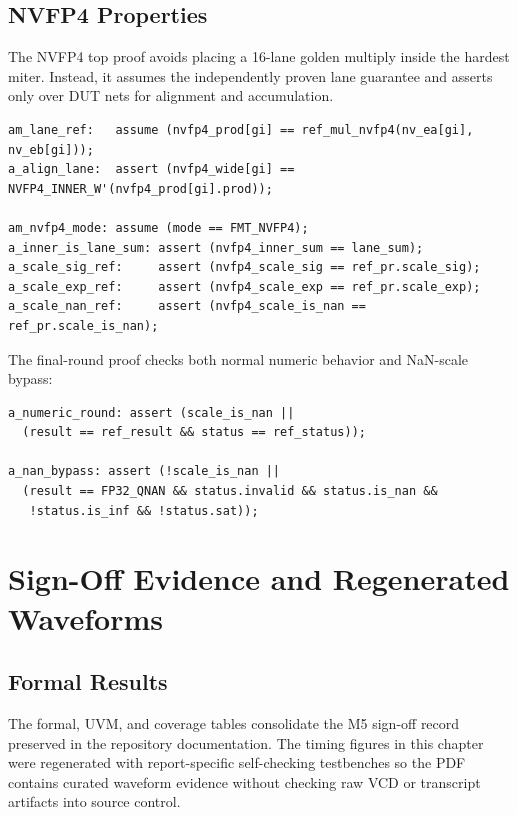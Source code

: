 \documentclass[11pt,oneside]{report}
\begin{document}
\section{NVFP4 Properties}

The NVFP4 top proof avoids placing a 16-lane golden multiply inside the hardest
miter. Instead, it assumes the independently proven lane guarantee and asserts
only over DUT nets for alignment and accumulation.

\begin{lstlisting}[style=sv,caption={NVFP4 top assume-guarantee properties}]
am_lane_ref:   assume (nvfp4_prod[gi] == ref_mul_nvfp4(nv_ea[gi], nv_eb[gi]));
a_align_lane:  assert (nvfp4_wide[gi] == NVFP4_INNER_W'(nvfp4_prod[gi].prod));

am_nvfp4_mode: assume (mode == FMT_NVFP4);
a_inner_is_lane_sum: assert (nvfp4_inner_sum == lane_sum);
a_scale_sig_ref:     assert (nvfp4_scale_sig == ref_pr.scale_sig);
a_scale_exp_ref:     assert (nvfp4_scale_exp == ref_pr.scale_exp);
a_scale_nan_ref:     assert (nvfp4_scale_is_nan == ref_pr.scale_is_nan);
\end{lstlisting}

The final-round proof checks both normal numeric behavior and NaN-scale bypass:

\begin{lstlisting}[style=sv,caption={NVFP4 final-round properties}]
a_numeric_round: assert (scale_is_nan ||
  (result == ref_result && status == ref_status));

a_nan_bypass: assert (!scale_is_nan ||
  (result == FP32_QNAN && status.invalid && status.is_nan &&
   !status.is_inf && !status.sat));
\end{lstlisting}

\chapter{Sign-Off Evidence and Regenerated Waveforms}

\section{Formal Results}

The formal, UVM, and coverage tables consolidate the M5 sign-off record
preserved in the repository documentation. The timing figures in this chapter
were regenerated with report-specific self-checking testbenches so the PDF
contains curated waveform evidence without checking raw VCD or transcript
artifacts into source control.
\end{document}
